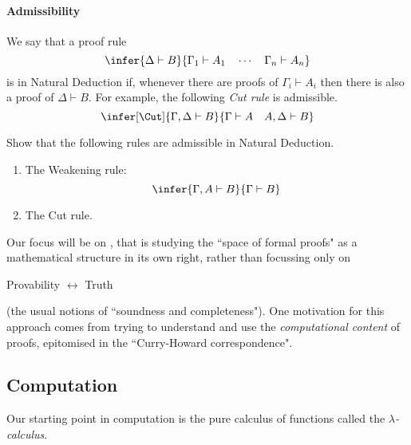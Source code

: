 \documentclass{svmult}
\begin{document}
\paragraph{Admissibility}
We say that a proof rule
\[ \infer{\Delta\vdash B}{\Gamma_1\vdash A_1\quad\cdots\quad\Gamma_n\vdash A_n} \]
is  in Natural Deduction if, whenever there are proofs of $\Gamma_i\vdash A_i$ then there is also a proof of $\Delta\vdash B$. For example, the following \emph{Cut rule} is admissible.
\[ \infer[\Cut]{\Gamma,\Delta\vdash B}{\Gamma\vdash A\quad A,\Delta\vdash B} \]

\begin{myexercise}
Show that the following rules are admissible in Natural Deduction.
\begin{enumerate}
\item The Weakening rule:
\[ \infer{\Gamma,A\vdash B}{\Gamma\vdash B} \]
\item The Cut rule.
\end{enumerate}
\end{myexercise}
%
Our focus will be on , that is studying the ``space of formal proofs" as a mathematical structure in its own right,
rather than  focussing only on
\begin{center}
Provability $\longleftrightarrow$ Truth
\end{center}
(\ie the usual notions of ``soundness and completeness"). One motivation for this approach comes from trying to understand and use the
\emph{computational content} of proofs, epitomised in the ``Curry-Howard correspondence".

\subsection{Computation}
Our starting point in computation is the pure calculus of functions called the \emph{$\lambda$-calculus}.
\end{document}
